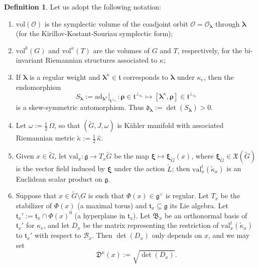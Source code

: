 \documentclass[12pt,a4paper]{article}
\theoremstyle{plain}
\theoremstyle{definition}
\newtheorem{defn}[thm]{Definition}%
\begin{document}
\begin{defn}
Let us adopt the following notation:
%
\begin{enumerate}
\item $\mathrm{vol}(\mathcal{O})$ is the 
symplectic volume of the coadjoint orbit $\mathcal{O}
=\mathcal{O}_{\boldsymbol{\lambda}}$ through 
$\boldsymbol{\lambda}$ (for the Kirillov-Kostant-Souriau symplectic form);
%
\item $\mathrm{vol}^k(G)$ and $\mathrm{vol}^\kappa (T)$
are the volumes of $G$ and $T$, respectively, for the 
bi-invariant Riemannian structures associated to $\kappa$;
%
\item If $\boldsymbol{\lambda}$ is a regular weight
and $\boldsymbol{\lambda}^\kappa\in \mathfrak{t}$ corresponds to
$\boldsymbol{\lambda}$ under $\kappa_e$, then the
endomorphism
\begin{equation}
\label{eqn:inf adoint iso}
S_{\boldsymbol{\lambda}}:=\left.
\mathrm{ad}_{\boldsymbol{\lambda}^\kappa}
\right |_{\mathfrak{t}^{\perp_{\kappa_e}}}:\boldsymbol{\rho}\in 
\mathfrak{t}^{\perp_{\kappa_e}}\mapsto 
\left[\boldsymbol{\lambda}^\kappa , \boldsymbol{\rho}\right]
\in \mathfrak{t}^{\perp_{\kappa_e}}
\end{equation}
is a skew-symmetric automorphism. Thus 
$\mathfrak{d}_{\boldsymbol{\lambda}}:=\det(S_{\boldsymbol{\lambda}})
>0$.
%
\item Let $\omega:=\frac{1}{2}\,\Omega$,
so that $(\tilde{G},J,\omega)$ is K\"{a}hler manifold
with associated Riemannian metric $\tilde{\kappa}:=
\frac{1}{2}\,\hat{\kappa}$.
%
\item Given $x\in \tilde{G}$, let $\mathrm{val}_x:
\mathfrak{g}\rightarrow T_x\tilde{G}$ be the map
$\boldsymbol{\xi}\mapsto \boldsymbol{\xi}_{\tilde{G}}(x)$,
where $\boldsymbol{\xi}_{\tilde{G}}\in \mathfrak{X}(\tilde{G})$
is the vector field induced by $\boldsymbol{\xi}$ under 
the action $\tilde{L}$; then $\mathrm{val}_x^t(\tilde{\kappa}_x)$ is an
Euclidean scalar product on $\mathfrak{g}$. 

\item Suppose that $x\in \tilde{G}\setminus G$ 
is such that $\Phi(x)\in \mathfrak{g}^\vee$
is regular. 
Let $T_x$ be the stabilizer of 
$\Phi(x)$ (a maximal torus) and $\mathfrak{t}_x\subseteq \mathfrak{g}$
its Lie algebra. Let
$\mathfrak{t}_x':=\mathfrak{t}_x\cap \Phi(x)^0$
(a hyperplane in $\mathfrak{t}_x$). Let $\mathfrak{B}_x$
be an orthonormal basis of $\mathfrak{t}_x'$ for $\kappa_e$,
and let $D_x$ be the matrix representing the
restriction of $\mathrm{val}_x^t(\tilde{\kappa}_x)$ to $\mathfrak{t}_x'$
with respect to $\mathcal{B}_x$.
Then $\det(D_x)$ only depends on $x$, and we may set
$$
\mathfrak{D}^\kappa(x):=\sqrt{\det(D_x)}.
$$
\end{enumerate}

\end{defn}
\end{document}
